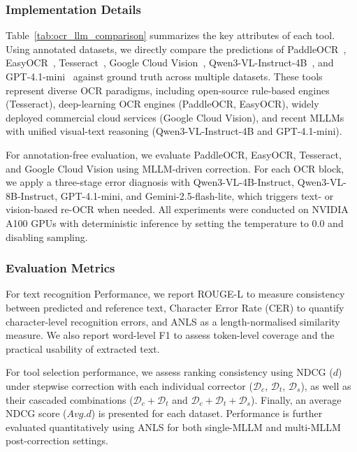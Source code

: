 \documentclass[11pt]{article}
\begin{document}
\subsubsection{Implementation Details}

Table~\ref{tab:ocr_llm_comparison} summarizes the key attributes of each tool. Using annotated datasets, we directly compare the predictions of PaddleOCR~\cite{cui2025paddleocr30technicalreport}, EasyOCR~\cite{easyocr_2023}, Tesseract~\cite{tesseract_ocr_5}, Google Cloud Vision~\cite{google_cloud_vision_ocr}, Qwen3-VL-Instruct-4B~\cite{Qwen3-VL}, and GPT-4.1-mini~\cite{gpt4o} against ground truth across multiple datasets. These tools represent diverse OCR paradigms, including open-source rule-based engines (Tesseract), deep-learning OCR engines (PaddleOCR, EasyOCR), widely deployed commercial cloud services (Google Cloud Vision), and recent MLLMs with unified visual-text reasoning (Qwen3-VL-Instruct-4B and GPT-4.1-mini). 

For annotation-free evaluation, we evaluate PaddleOCR, EasyOCR, Tesseract, and Google Cloud Vision using MLLM-driven correction. For each OCR block, we apply a three-stage error diagnosis with Qwen3-VL-4B-Instruct, Qwen3-VL-8B-Instruct, GPT-4.1-mini, and Gemini-2.5-flash-lite, which triggers text- or vision-based re-OCR when needed. All experiments were conducted on NVIDIA A100 GPUs with deterministic inference by setting the temperature to 0.0 and disabling sampling.


\subsubsection{Evaluation Metrics}
For text recognition Performance, we report ROUGE-L to measure consistency between predicted and reference text, Character Error Rate (CER) to quantify character-level recognition errors, and ANLS as a length-normalised similarity measure. We also report word-level F1 to assess token-level coverage and the practical usability of extracted text. 

For tool selection performance, we assess ranking consistency using NDCG ($d$) under stepwise correction with each individual corrector ($\mathcal{D}_c$, $\mathcal{D}_t$, $\mathcal{D}_s$), as well as their cascaded combinations ($\mathcal{D}_c+\mathcal{D}_t$ and $\mathcal{D}_c+\mathcal{D}_t+\mathcal{D}_s$). Finally, an average NDCG score ($Avg.d$) is presented for each dataset. Performance is further evaluated quantitatively using ANLS for both single-MLLM and multi-MLLM post-correction settings. 
 
\end{document}
